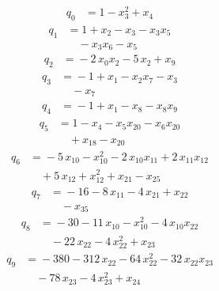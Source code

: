 \begingroup
\fontsize{9}{11}\selectfont
\allowdisplaybreaks[0]
\setlength{\abovedisplayskip}{3pt}
\setlength{\belowdisplayskip}{3pt}
\setlength{\abovedisplayshortskip}{3pt}
\setlength{\belowdisplayshortskip}{3pt}
\setlength{\jot}{1pt}
\begin{align*}
q_{0} &={}1 -x_{3}^{2} +x_{4}
\end{align*}
\begin{align*}
q_{1} &={}1 +x_{2} -x_{3} -x_{3}x_{5}\\
&\quad -x_{3}x_{6} -x_{5}
\end{align*}
\begin{align*}
q_{2} &={}-2\,x_{0}x_{2} -5\,x_{2} +x_{9}
\end{align*}
\begin{align*}
q_{3} &={}-1 +x_{1} -x_{2}x_{7} -x_{3}\\
&\quad -x_{7}
\end{align*}
\begin{align*}
q_{4} &={}-1 +x_{1} -x_{8} -x_{8}x_{9}
\end{align*}
\begin{align*}
q_{5} &={}1 -x_{4} -x_{5}x_{20} -x_{6}x_{20}\\
&\quad +x_{18} -x_{20}
\end{align*}
\begin{align*}
q_{6} &={}-5\,x_{10} -x_{10}^{2} -2\,x_{10}x_{11} +2\,x_{11}x_{12}\\
&\quad +5\,x_{12} +x_{12}^{2} +x_{21} -x_{25}
\end{align*}
\begin{align*}
q_{7} &={}-16 -8\,x_{11} -4\,x_{21} +x_{22}\\
&\quad -x_{35}
\end{align*}
\begin{align*}
q_{8} &={}-30 -11\,x_{10} -x_{10}^{2} -4\,x_{10}x_{22}\\
&\quad -22\,x_{22} -4\,x_{22}^{2} +x_{23}
\end{align*}
\begin{align*}
q_{9} &={}-380 -312\,x_{22} -64\,x_{22}^{2} -32\,x_{22}x_{23}\\
&\quad -78\,x_{23} -4\,x_{23}^{2} +x_{24}
\end{align*}
